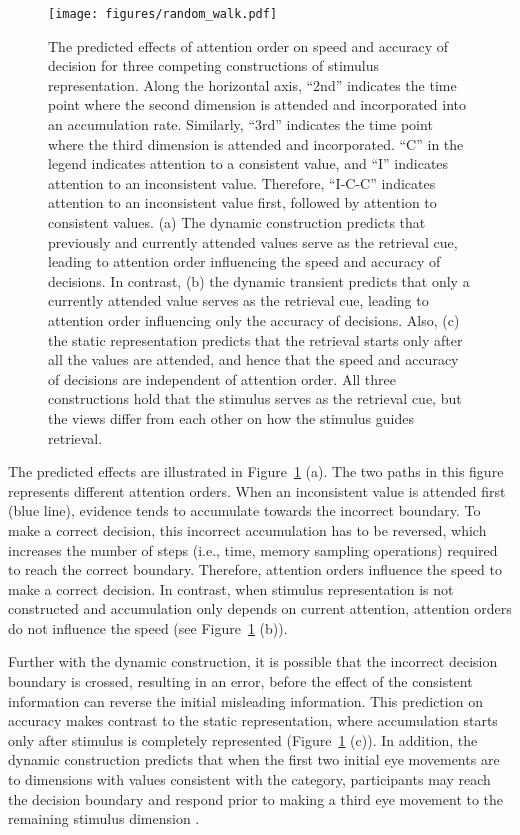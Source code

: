 \documentclass[man,floatsintext]{apa6}
\begin{document}
\begin{figure}[h!]
    \centering
    \texttt{[image: figures/random\_walk.pdf]}

    \caption{The predicted effects of attention order on speed and accuracy of decision for three
    competing constructions of stimulus representation. Along the horizontal axis, ``2nd'' indicates
    the time point where the second dimension is attended and incorporated into an accumulation
    rate.  Similarly, ``3rd'' indicates the time point where the third dimension is attended and
    incorporated. ``C'' in the legend indicates attention to a consistent value, and ``I'' indicates
    attention to an inconsistent value. Therefore, ``I-C-C'' indicates attention to an inconsistent
    value first, followed by attention to consistent values.  (a) The dynamic construction predicts
    that previously and currently attended values serve as the retrieval cue, leading to attention
    order influencing the speed and accuracy of decisions. In contrast, (b) the dynamic transient
    predicts that only a currently attended value serves as the retrieval cue, leading to attention
    order influencing only the accuracy of decisions. Also, (c) the static representation predicts
    that the retrieval starts only after all the values are attended, and hence that the speed and
    accuracy of decisions are independent of attention order. All three constructions hold that the
    stimulus serves as the retrieval cue, but the views differ from each other on how the stimulus
    guides retrieval.}

\label{fig:example}
\end{figure}

The predicted effects are illustrated in Figure~\ref{fig:example} (a). The two paths in this figure
represents different attention orders.  When an inconsistent value is attended first (blue line),
evidence tends to accumulate towards the incorrect boundary. To make a correct decision, this
incorrect accumulation has to be reversed, which increases the number of steps (i.e., time, memory
sampling operations) required to reach the correct boundary. Therefore, attention orders influence
the speed to make a correct decision. In contrast, when stimulus representation is not constructed
and accumulation only depends on current attention, attention orders do not influence the speed (see
Figure~\ref{fig:example} (b)).

Further with the dynamic construction, it is possible that the incorrect decision boundary is
crossed, resulting in an error, before the effect of the consistent information can reverse the
initial misleading information. This prediction on accuracy makes contrast to the static
representation, where accumulation starts only after stimulus is completely represented
(Figure~\ref{fig:example} (c)). In addition, the dynamic construction predicts that when the first
two initial eye movements are to dimensions with values consistent with the category, participants
may reach the decision boundary and respond prior to making a third eye movement to the remaining
stimulus dimension \parencite[cf.][]{Blair2009, Blair2009b}.
\end{document}
